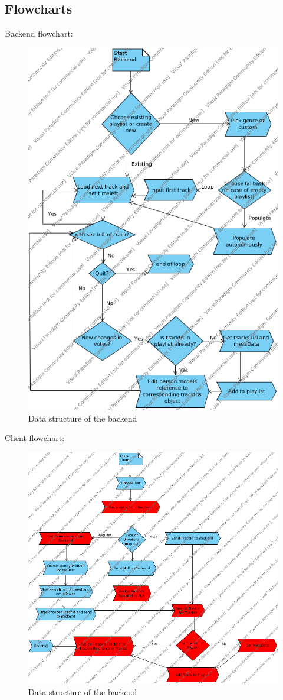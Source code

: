 \subsection{Flowcharts}

Backend flowchart:
\begin{figure}
  \centering
  \includegraphics[width=0.5\linewidth]{Images/backendFlowchart.png}
  \caption{Data structure of the backend}
  \label{fig:backendDS}
\end{figure}

Client flowchart:

\begin{figure}
  \centering
  \includegraphics[width=0.5\linewidth]{Images/clientFlowchart.png}
  \caption{Data structure of the backend}
  \label{fig:backendDS}
\end{figure}